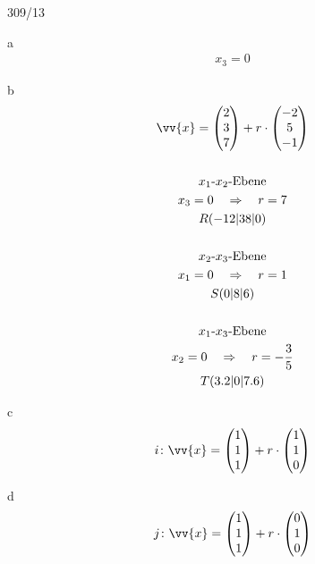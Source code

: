 \begin{exercise}{309/13}
  \item [a]
  \begin{gather*}
    x_3 = 0
  \end{gather*}
  \item [b]
  \begin{gather*}
    \vv{x} = \begin{pmatrix}2 \\ 3 \\ 7\end{pmatrix} + r \cdot \begin{pmatrix}-2 \\ 5 \\ -1\end{pmatrix} \\\\
    \text{$x_1$-$x_2$-Ebene} \\
    x_3 = 0 \quad\Rightarrow\quad r = 7 \\
    R(-12|38|0) \\\\
    \text{$x_2$-$x_3$-Ebene} \\
    x_1 = 0 \quad\Rightarrow\quad r = 1 \\
    S(0|8|6) \\\\
    \text{$x_1$-$x_3$-Ebene} \\
    x_2 = 0 \quad\Rightarrow\quad r = -\frac{3}{5} \\
    T(3.2|0|7.6)
  \end{gather*}
  \item [c]
  \begin{gather*}
    i \colon \vv{x} = \begin{pmatrix}1 \\ 1 \\ 1\end{pmatrix} + r \cdot \begin{pmatrix}1 \\ 1 \\ 0\end{pmatrix}
  \end{gather*}
  \item [d]
  \begin{gather*}
    j \colon \vv{x} = \begin{pmatrix}1 \\ 1 \\ 1\end{pmatrix} + r \cdot \begin{pmatrix}0 \\ 1 \\ 0\end{pmatrix}
  \end{gather*}
\end{exercise}
\newpage
